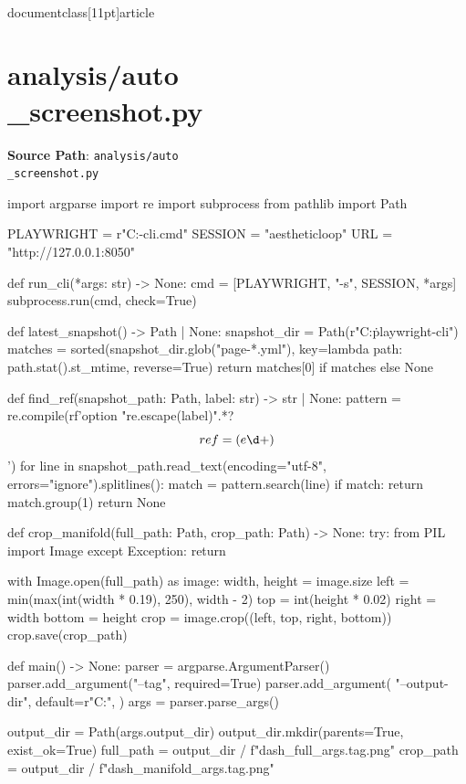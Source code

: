 \\documentclass[11pt]{article}
\begin{document}
\section*{analysis/auto\\_screenshot.py}
\textbf{Source Path}: \texttt{analysis/auto\\_screenshot.py}\par
\bigskip
\begin{CodeBlock}
import argparse
import re
import subprocess
from pathlib import Path


PLAYWRIGHT = r"C:\Users\Andrew\AppData\Roaming\npm\playwright-cli.cmd"
SESSION = "aestheticloop"
URL = "http://127.0.0.1:8050"


def run_cli(*args: str) -> None:
    cmd = [PLAYWRIGHT, "-s", SESSION, *args]
    subprocess.run(cmd, check=True)


def latest_snapshot() -> Path | None:
    snapshot_dir = Path(r"C:\Users\Andrew\.playwright-cli")
    matches = sorted(snapshot_dir.glob("page-*.yml"), key=lambda path: path.stat().st_mtime, reverse=True)
    return matches[0] if matches else None


def find_ref(snapshot_path: Path, label: str) -> str | None:
    pattern = re.compile(rf'option "{re.escape(label)}".*?\[ref=(e\d+)\]')
    for line in snapshot_path.read_text(encoding="utf-8", errors="ignore").splitlines():
        match = pattern.search(line)
        if match:
            return match.group(1)
    return None


def crop_manifold(full_path: Path, crop_path: Path) -> None:
    try:
        from PIL import Image
    except Exception:
        return

    with Image.open(full_path) as image:
        width, height = image.size
        left = min(max(int(width * 0.19), 250), width - 2)
        top = int(height * 0.02)
        right = width
        bottom = height
        crop = image.crop((left, top, right, bottom))
        crop.save(crop_path)


def main() -> None:
    parser = argparse.ArgumentParser()
    parser.add_argument("--tag", required=True)
    parser.add_argument(
        "--output-dir",
        default=r"C:\Users\Andrew\output\playwright",
    )
    args = parser.parse_args()

    output_dir = Path(args.output_dir)
    output_dir.mkdir(parents=True, exist_ok=True)
    full_path = output_dir / f"dash_full_{args.tag}.png"
    crop_path = output_dir / f"dash_manifold_{args.tag}.png"


\end{CodeBlock}
\end{document}

